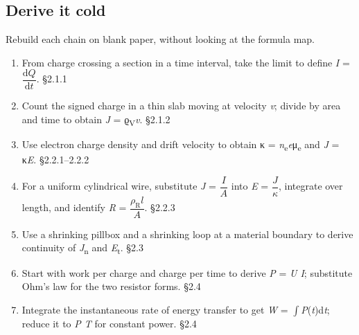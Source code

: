 \documentclass[11pt]{article}
\begin{document}
\begin{keepsection}
\section{Derive it cold}

Rebuild each chain on blank paper, without looking at the formula map.

\begin{enumerate}
\item From charge crossing a section in a time interval, take the limit to define \textit{I} = {\small\ensuremath{\dfrac{\mathrm{d}{Q}}{\mathrm{d}{t}}}}. \hfill{\small\color{FAUblue}§2.1.1}
\item Count the signed charge in a thin slab moving at velocity \textit{v}; divide by area and time to obtain \textit{J} = ϱ\textsubscript{V}\textit{v}. \hfill{\small\color{FAUblue}§2.1.2}
\item Use electron charge density and drift velocity to obtain κ = \textit{n}\textsubscript{e}\textit{e}μ\textsubscript{e} and \textit{J} = κ\textit{E}. \hfill{\small\color{FAUblue}§2.2.1–2.2.2}
\item For a uniform cylindrical wire, substitute \textit{J} = {\small\ensuremath{\dfrac{{I}}{{A}}}} into \textit{E} = {\small\ensuremath{\dfrac{{J}}{κ}}}, integrate over length, and identify \textit{R} = {\small\ensuremath{\dfrac{ρ_{\mathrm{R}}{l}}{{A}}}}. \hfill{\small\color{FAUblue}§2.2.3}
\item Use a shrinking pillbox and a shrinking loop at a material boundary to derive continuity of \textit{J}\textsubscript{n} and \textit{E}\textsubscript{t}. \hfill{\small\color{FAUblue}§2.3}
\item Start with work per charge and charge per time to derive \textit{P} = \textit{U I}; substitute Ohm’s law for the two resistor forms. \hfill{\small\color{FAUblue}§2.4}
\item Integrate the instantaneous rate of energy transfer to get \textit{W} = $\int $\textit{P}(\textit{t})d\textit{t}; reduce it to \textit{P T} for constant power. \hfill{\small\color{FAUblue}§2.4}
\end{enumerate}
\end{keepsection}
\end{document}
